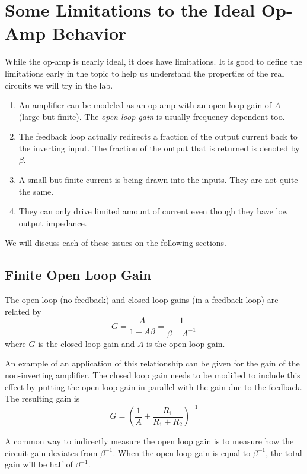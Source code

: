 \documentclass{article}
\begin{document}
\section{Some Limitations to the Ideal Op-Amp Behavior}
While the op-amp is nearly ideal, it does have limitations. It is good to define the limitations early in the topic to help us understand the properties of the real circuits we will try in the lab.
\begin{enumerate}
\item An amplifier can be modeled as an op-amp with an open loop gain of $A$ (large but finite). The \emph{open loop gain} is usually frequency dependent too. 
\item The feedback loop actually redirects a fraction of the output current back to the inverting input. The fraction of the output that is returned is denoted by $\beta$. 
\item A small but finite current is being drawn into the inputs. They are not quite the same. 
\item They can only drive limited amount of current even though they have low output impedance. 
\end{enumerate}
We will discuss each of these issues on the following sections.

\subsection{Finite Open Loop Gain}
The open loop (no feedback) and closed loop gains (in a feedback loop) are related by
\begin{equation}
G = \frac{A}{1 + A \beta} = \frac{1}{\beta + A^{-1}}
\end{equation}
where $G$ is the closed loop gain and $A$ is the open loop gain. 

An example of an application of this relationship can be given for the gain of the non-inverting amplifier.  The closed loop gain needs to be modified to include this effect by putting the open loop gain in parallel with the gain due to the feedback. The resulting gain is
\begin{equation}
G = \left( \frac{1}{A} + \frac{R_1}{R_1 + R_2} \right)^{-1}
\end{equation}

A common way to indirectly measure the open loop gain is to measure how the circuit gain deviates from $\beta^{-1}$. When the open loop gain is equal to $\beta^{-1}$, the total gain will be half of $\beta^{-1}$.
\end{document}
